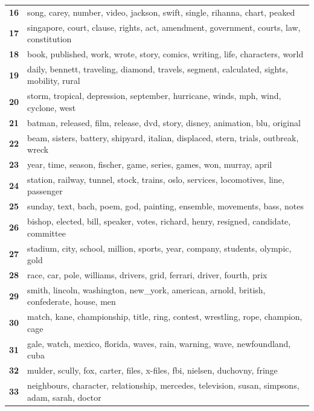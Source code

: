 \begin{table}[htpb]
\begin{tabularx}{\textwidth}{@{}l X@{}}
        \textbf{16} & song, carey, number, video, jackson, swift, single, rihanna, chart, peaked \\
        \textbf{17} & singapore, court, clause, rights, act, amendment, government, courts, law, constitution \\
        \textbf{18} & book, published, work, wrote, story, comics, writing, life, characters, world \\
        \textbf{19} & daily, bennett, traveling, diamond, travels, segment, calculated, sights, mobility, rural \\
        \textbf{20} & storm, tropical, depression, september, hurricane, winds, mph, wind, cyclone, west \\
        \textbf{21} & batman, released, film, release, dvd, story, disney, animation, blu, original \\
        \textbf{22} & beam, sisters, battery, shipyard, italian, displaced, stern, trials, outbreak, wreck \\
        \textbf{23} & year, time, season, fischer, game, series, games, won, murray, april \\
        \textbf{24} & station, railway, tunnel, stock, trains, oslo, services, locomotives, line, passenger \\
        \textbf{25} & sunday, text, bach, poem, god, painting, ensemble, movements, bass, notes \\
        \textbf{26} & bishop, elected, bill, speaker, votes, richard, henry, resigned, candidate, committee \\
        \textbf{27} & stadium, city, school, million, sports, year, company, students, olympic, gold \\
        \textbf{28} & race, car, pole, williams, drivers, grid, ferrari, driver, fourth, prix \\
        \textbf{29} & smith, lincoln, washington, new\_york, american, arnold, british, confederate, house, men \\
        \textbf{30} & match, kane, championship, title, ring, contest, wrestling, rope, champion, cage \\
        \textbf{31} & gale, watch, mexico, florida, waves, rain, warning, wave, newfoundland, cuba \\
        \textbf{32} & mulder, scully, fox, carter, files, x-files, fbi, nielsen, duchovny, fringe \\
        \textbf{33} & neighbours, character, relationship, mercedes, television, susan, simpsons, adam, sarah, doctor \\

\end{tabularx}
\end{table}
